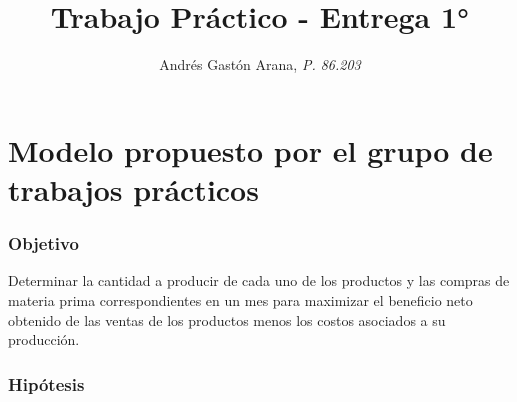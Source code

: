 \documentclass[a4paper,11pt]{article}
\title{\textbf{Trabajo Práctico} - Entrega 1°}
\author{Andrés Gastón Arana, \textit{P. 86.203}}
\date{}
\begin{document}
\maketitle
\clearpage

\tableofcontents
\clearpage

\part{Modelo propuesto por el grupo de trabajos prácticos}

\section{Objetivo}

Determinar la cantidad a producir de cada uno de los productos y las compras de
materia prima correspondientes en un mes para maximizar el beneficio neto
obtenido de las ventas de los productos menos los costos asociados a su
producción.

\section{Hipótesis}
\end{document}
